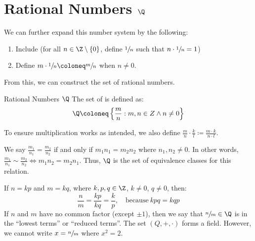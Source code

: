 \section{Rational Numbers $\Q$}

We can further expand this number system by the following:
\begin{enumerate}
    \item Include  (for all $n \in \Z \setminus \{0\}$, define $\sfrac{1}{n}$ such that $n \cdot \sfrac{1}{n} = 1$)
    \item Define $m \cdot \sfrac{1}{n} \coloneq \sfrac{m}{n}$ when $n \neq 0$.
\end{enumerate}

From this, we can construct the set of rational numbers.

\begin{dfnbox}{Rational Numbers $\Q$}{}
    The set of  is defined as:
    \[ \Q \coloneq \left\{ \frac{m}{n} : m,n \in Z \land n \neq 0 \right\} \]
\end{dfnbox}

To ensure multiplication works as intended, we also define $\frac{m}{n} \cdot \frac{k}{l} \coloneq \frac{m \cdot k}{n \cdot l}$.

We say $\frac{m_1}{n_1} = \frac{m_2}{n_2}$ if and only if $m_1n_1 = m_2n_2$ where $n_1, n_2 \neq 0$. In other words, $\frac{m_1}{n_1} \sim \frac{m_2}{n_2} \iff m_1n_2 = m_2n_1$. Thus, $\Q$ is the set of equivalence classes for this relation.

If $n = kp$ and $m = kq$, where $k,p,q \in \Z$, $k \neq 0$, $q \neq 0$, then:
\[ \frac{n}{m} = \frac{kp}{kq} = \frac{k}{p}, \quad \text{because}\ kpq = kqp \]
If $n$ and $m$ have no common factor (except $\pm 1$), then we say that $\sfrac{n}{m} \in \Q$ is in the ``lowest terms'' or ``reduced terms''. The set $(Q, +, \cdot)$ forms a field. However, we cannot write $x = \sfrac{n}{m}$ where $x^2 = 2$.

